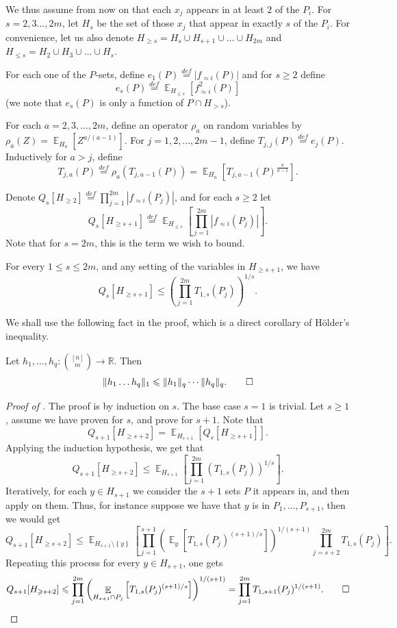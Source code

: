 \documentclass{toc}
\newcommand\card[1]{\left| {#1} \right|}
\newcommand\set[1]{{\left\{ #1 \right\}}}
\newcommand\Expect[2]{{\mathop{\mathbb{E}}_{#1}\left[ {#2} \right]}}
\newcommand\norm[1]{\| #1 \|}
\newcommand\defeq{\stackrel{def}{=}}
\renewcommand\geq{\geqslant}
\renewcommand\leq{\leqslant}
\newcommand\approxlvlfn[2]{{#1}_{\approx{#2}}}
\begin{document}
We thus assume from now on that each $x_j$ appears in at least $2$ of the
%
$P_i$.   %
For $s=2,3\ldots,2m$, let $H_s$ be the set of %
those $x_j$   %
that appear in exactly $s$ of the %
$P_i$.   %
For convenience, let us also denote $H_{\geq s} = H_s\cup H_{s+1}\cup\ldots\cup H_{2m}$ and
$H_{\leq s} = H_2\cup H_{3}\cup\ldots\cup H_{s}$.

For each one of the $P$-sets, define
$e_1(P) \defeq \card{\approxlvlfn{f}{i}(P)}$ and for $s\geq 2$ define
\[
e_{s}(P) \defeq \Expect{H_{\leq s}}{\approxlvlfn{f}{i}^2(P)}
\]
(we note that $e_s(P)$ is only a function of $P\cap H_{>s}$).

For each $a=2,3,\ldots, 2m$, define an operator $\rho_a$ on random variables by $\rho_a(Z) = \Expect{H_a}{Z^{a/(a-1)}}$.
For $j=1,2,\ldots, 2m-1$, define $T_{j,j}(P) \defeq e_j(P)$.
Inductively for $a>j$, define
\[
T_{j,a}(P) \defeq
\rho_a( T_{j,a-1}(P))
=
\Expect{H_a}{T_{j,a-1}(P)^{\frac{a}{a-1}}}.
\]

Denote $Q_s[ H_{\geq 2}] \defeq
\prod\limits_{j=1}^{2m}{\card{\approxlvlfn{f}{i}(P_j)}}$, and for each $s\geq 2$ let
\[
Q_s[ H_{\geq s+1}] \defeq \Expect{H_{\leq s}}{
\prod\limits_{j=1}^{2m}{\card{\approxlvlfn{f}{i}(P_j)}}}.
\]
Note that for $s=2m$, this is the term we wish to bound.

\begin{proposition}\label{prop:induct}
For every $1\leq s\leq 2m$, and any setting of the variables in $H_{\geq s+1}$, we have
\[
Q_s[H_{\geq s+1}]
\leq \left(\prod\limits_{j=1}^{2m}{T_{1,s}(P_j)}\right)^{1/s}.
\]
\end{proposition}
We shall use the following fact in the proof, which is a direct corollary of H\"{o}lder's inequality.
\begin{fact}\label{fact:holder}
Let $h_1,\ldots,h_q\colon \binom{[n]}{m}\to \mathbb{R}$. Then
\[
\norm{h_1\dots h_q}_1 \leq \norm{h_1}_q\cdots \norm{h_q}_q.
\qedhere
\]
\end{fact}
\begin{proof}[Proof of ]
The proof is by induction on $s$.
The base case $s=1$ is trivial. Let $s\geq 1$, assume we have proven for $s$, and prove for $s+1$.
Note that
\[
Q_{s+1}[H_{\geq s+2}]
=\Expect{H_{s+1}}{Q_s[H_{\geq s+1}]}.
\]
Applying the induction hypothesis, we get that
\[
Q_{s+1}[H_{\geq s+2}]
\leq \Expect{H_{s+1}}{\prod\limits_{j=1}^{2m}{\left(T_{1,s}(P_j)\right)^{1/s}}}.
\]
Iteratively, for each $y\in H_{s+1}$ we consider the $s+1$
%
sets $P$   %
it appears in,
and then apply  on them. Thus, for instance suppose we have that $y$ is in $P_1,\ldots, P_{s+1}$, then we would get
\[
Q_{s+1}[H_{\geq s+2}]
\leq \Expect{H_{s+1}\setminus \set{y}}{
\prod\limits_{j=1}^{s+1}{\left(\Expect{y}{T_{1,s}(P_j)^{(s+1)/s}}\right)^{1/(s+1)}}
\prod\limits_{j=s+2}^{2m}{T_{1,s}(P_j)}}.
\]
Repeating this process for every $y\in H_{s+1}$, one gets
\[
Q_{s+1}[H_{\geq s+2}]
\leq
\prod\limits_{j=1}^{2m}{\left(\Expect{H_{s+1}\cap P_j}{T_{1,s}(P_j)^{(s+1)/s}}\right)^{1/(s+1)}}
=\prod\limits_{j=1}^{2m}{T_{1,s+1}(P_j)^{1/(s+1)}}.
\qedhere %
\]
\end{proof}
\end{document}
